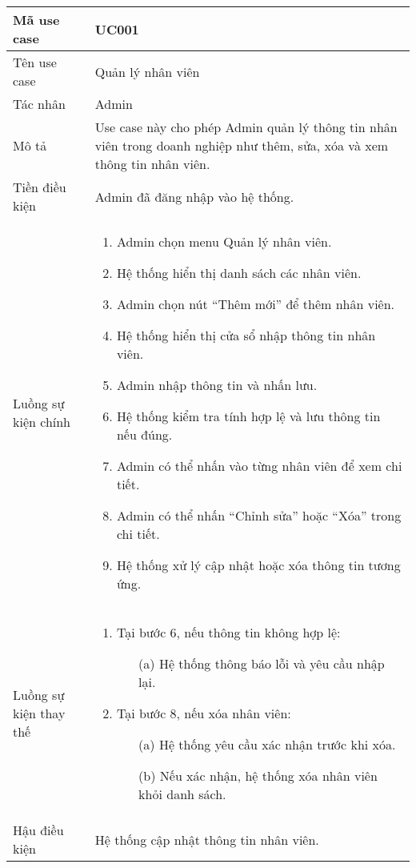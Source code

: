 \documentclass[../DoAn.tex]{subfiles}
\begin{document}
\begin{longtable}{|p{}|p{}|}
    Mã use case & UC001 \\
    \hline
    Tên use case & Quản lý nhân viên \\
    \hline
    Tác nhân & Admin \\
    \hline
    Mô tả & Use case này cho phép Admin quản lý thông tin nhân viên trong doanh nghiệp như thêm, sửa, xóa và xem thông tin nhân viên. \\
    \hline
    Tiền điều kiện & Admin đã đăng nhập vào hệ thống. \\
    \hline
    Luồng sự kiện chính &
    \begin{enumerate}
        \item Admin chọn menu Quản lý nhân viên.
        \item Hệ thống hiển thị danh sách các nhân viên.
        \item Admin chọn nút “Thêm mới” để thêm nhân viên.
        \item Hệ thống hiển thị cửa sổ nhập thông tin nhân viên.
        \item Admin nhập thông tin và nhấn lưu.
        \item Hệ thống kiểm tra tính hợp lệ và lưu thông tin nếu đúng.
        \item Admin có thể nhấn vào từng nhân viên để xem chi tiết.
        \item Admin có thể nhấn “Chỉnh sửa” hoặc “Xóa” trong chi tiết.
        \item Hệ thống xử lý cập nhật hoặc xóa thông tin tương ứng.
    \end{enumerate} \\
    \hline
    Luồng sự kiện thay thế &
    \begin{enumerate}
        \item Tại bước 6, nếu thông tin không hợp lệ:
        \begin{itemize}
            \item[(a)] Hệ thống thông báo lỗi và yêu cầu nhập lại.
        \end{itemize}
        \item Tại bước 8, nếu xóa nhân viên:
        \begin{itemize}
            \item[(a)] Hệ thống yêu cầu xác nhận trước khi xóa.
            \item[(b)] Nếu xác nhận, hệ thống xóa nhân viên khỏi danh sách.
        \end{itemize}
    \end{enumerate} \\
    \hline
    Hậu điều kiện & Hệ thống cập nhật thông tin nhân viên. \\
\end{longtable}
\end{document}
